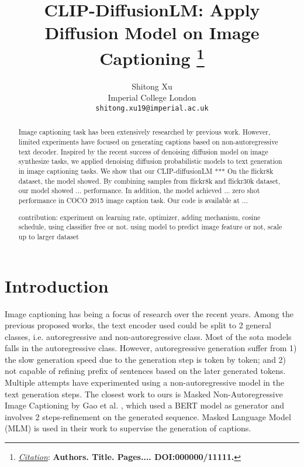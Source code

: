 \documentclass{article}
\title{CLIP-DiffusionLM: Apply Diffusion Model on Image Captioning
\thanks{\textit{\underline{Citation}}: 
\textbf{Authors. Title. Pages.... DOI:000000/11111.}} 
}
\author{
  Shitong Xu \\
  Imperial College London \\
  \texttt{shitong.xu19@imperial.ac.uk} \\
}
\begin{document}
\maketitle


\begin{abstract}
Image captioning task has been extensively researched by previous work. However, limited experiments have focused on generating captions based on non-autoregressive text decoder. Inspired by the recent success of denoising diffusion model on image synthesize tasks, we applied denoising diffusion probabilistic models to text generation in image captioning tasks. We show that our CLIP-diffusionLM *** On the flickr8k dataset, the model showed. By combining samples from flickr8k and flickr30k dataset, our model showed ... performance. In addition, the model achieved ... zero shot performance in COCO 2015 image caption task. Our code is available at ...

contribution: experiment on learning rate, optimizer, adding mechanism, cosine schedule, using classifier free or not. using model to predict image feature or not, scale up to larger dataset
\end{abstract}



\section{Introduction}
Image captioning has being a focus of research over the recent years. Among the previous proposed works, the text encoder used could be split to 2 general classes, i.e. autoregressive and non-autoregressive class. Most of the sota models falls in the autoregressive class\cite{https://doi.org/10.48550/arxiv.1412.6632,DBLP:journals/corr/XuBKCCSZB15,DBLP:journals/corr/LuXPS16,image-caption-with-pos,mplug}. However, autoregressive generation suffer from 1) the slow generation speed due to the generation step is token by token; and 2) not capable of refining prefix of sentences based on the later generated tokens. Multiple attempts have experimented using a non-autoregressive model in the text generation steps\cite{masked-non-autoregres, partial-autoregressive, semi-autoregressive}. The closest work to ours is Masked Non-Autoregressive Image Captioning by Gao et al. \cite{masked-non-autoregres}, which used a BERT model as generator and involves 2 steps-refinement on the generated sequence. Masked Language Model (MLM) is used in their work to supervise the generation of captions. 
\end{document}
